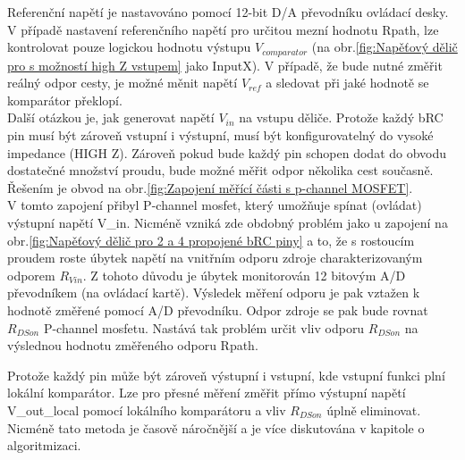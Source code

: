     Referenční napětí je nastavováno pomocí 12-bit D/A převodníku ovládací desky. V případě nastavení referenčního napětí
    pro určitou mezní hodnotu Rpath,
    lze kontrolovat pouze logickou hodnotu výstupu $V_{comparator}$
    (na obr.\ref{fig:Napěťový dělič pro s možností high Z vstupem} jako InputX).
    V případě, že bude nutné změřit reálný odpor cesty, je možné měnit napětí $V_{ref}$ a sledovat při jaké hodnotě se 
    komparátor překlopí.\\

    Další otázkou je, jak generovat napětí $V_{in}$ na vstupu děliče.
    Protože každý bRC pin musí být zároveň vstupní i výstupní, musí být konfigurovatelný do vysoké impedance (HIGH Z).
    Zároveň pokud bude každý pin schopen dodat do obvodu dostatečné množství proudu,
    bude možné měřit odpor několika cest současně.
    Řešením je obvod na obr.\ref{fig:Zapojení měřící části s p-channel MOSFET}.\\

    V tomto zapojení přibyl P-channel mosfet,
    který umožňuje spínat (ovládat) výstupní napětí V\_in.
    Nicméně vzniká zde obdobný problém jako u zapojení na obr.\ref{fig:Napěťový dělič pro 2 a 4 propojené bRC piny} a to,
    že s rostoucím proudem roste úbytek napětí na vnitřním odporu zdroje charakterizovaným
    odporem $R_{Vin}$. Z tohoto důvodu je úbytek monitorován 12 bitovým A/D převodníkem (na ovládací kartě).
    Výsledek měření odporu je pak vztažen k hodnotě změřené pomocí A/D převodníku.
    Odpor zdroje se pak bude rovnat $R_{DSon}$ P-channel mosfetu.
    Nastává tak problém určit vliv odporu $R_{DSon}$ na výslednou hodnotu změřeného odporu Rpath\cite{HOROWITZ,MARTINT}.
    \clearpage

    Protože každý pin může být zároveň výstupní i vstupní, kde vstupní funkci plní lokální komparátor.
    Lze pro přesné měření změřit přímo výstupní napětí V\_out\_local pomocí lokálního komparátoru a vliv $R_{DSon}$ úplně eliminovat.
    Nicméně tato metoda je časově náročnější a je více diskutována v kapitole o algoritmizaci.\\
        
